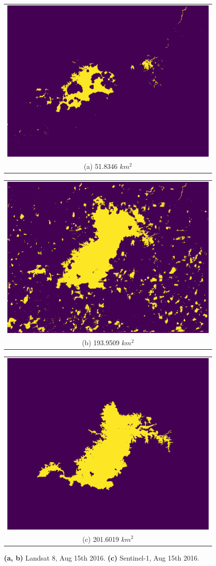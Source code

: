 \begin{figure}[h!]
    \begin{center}
        \begin{tabular}[b]{c}
            \includegraphics[width=0.3\linewidth]{figures/raw20160815_51_8346.png} \\
            \small (a) 51.8346 $km^2$
          \end{tabular}
          \begin{tabular}[b]{c}
            \includegraphics[width=0.3\linewidth]{figures/r20160815_193_9509.png} \\
            \small (b) 193.9509 $km^2$
          \end{tabular}
          \begin{tabular}[b]{c}
              \includegraphics[width=0.3\linewidth]{figures/20160815_201_6019.png} \\
              \small (c) 201.6019 $km^2$
          \end{tabular} 
    \end{center}
    \caption{
		\textbf{(a, b)} Landsat 8, Aug 15th 2016.
		\textbf{(c)} Sentinel-1, Aug 15th 2016.}
\end{figure}

